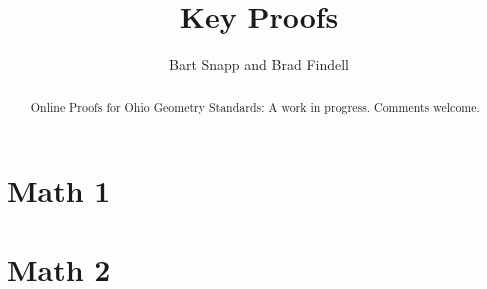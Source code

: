 \documentclass[handout,space,nooutcomes]{xourse}
\title{Key Proofs}
\author{Bart Snapp and Brad Findell}
\begin{document}
\begin{abstract}
Online Proofs for Ohio Geometry Standards:  A work in progress.  Comments welcome.
\end{abstract}
\maketitle

\part{Math 1}
\part{Math 2}
\end{document}
